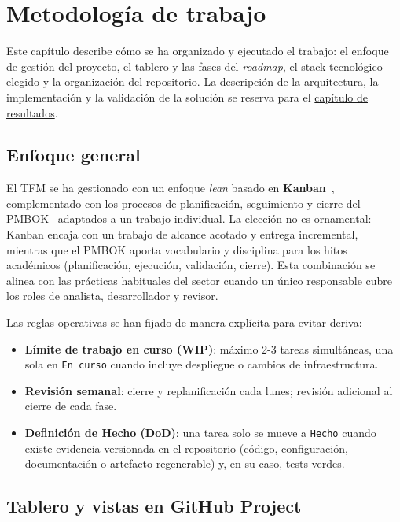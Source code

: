 \chapter{Metodología de trabajo}\label{cap:metodologia}

Este capítulo describe cómo se ha organizado y ejecutado el trabajo: el enfoque de gestión del proyecto, el tablero y las fases del \emph{roadmap}, el stack tecnológico elegido y la organización del repositorio. La descripción de la arquitectura, la implementación y la validación de la solución se reserva para el \hyperref[cap:resultados]{capítulo de resultados}.

\section{Enfoque general}

El TFM se ha gestionado con un enfoque \emph{lean} basado en \textbf{Kanban}~\cite{andersonKanban}, complementado con los procesos de planificación, seguimiento y cierre del \ac{PMBOK}~\cite{pmiPmbok7} adaptados a un trabajo individual. La elección no es ornamental: Kanban encaja con un trabajo de alcance acotado y entrega incremental, mientras que el \ac{PMBOK} aporta vocabulario y disciplina para los hitos académicos (planificación, ejecución, validación, cierre). Esta combinación se alinea con las prácticas habituales del sector cuando un único responsable cubre los roles de analista, desarrollador y revisor.

Las reglas operativas se han fijado de manera explícita para evitar deriva:

\begin{itemize}
    \item \textbf{Límite de trabajo en curso (WIP)}: máximo 2-3 tareas simultáneas, una sola en \texttt{En curso} cuando incluye despliegue o cambios de infraestructura.
    \item \textbf{Revisión semanal}: cierre y replanificación cada lunes; revisión adicional al cierre de cada fase.
    \item \textbf{Definición de Hecho (DoD)}: una tarea solo se mueve a \texttt{Hecho} cuando existe evidencia versionada en el repositorio (código, configuración, documentación o artefacto regenerable) y, en su caso, tests verdes.
\end{itemize}

\section{Tablero y vistas en GitHub Project}

